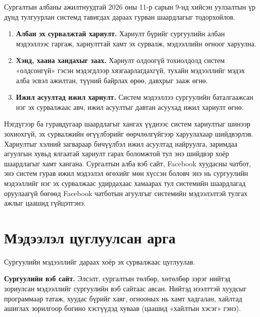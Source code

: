 Сургалтын албаны ажилтнуудтай 2026 оны 11-р сарын 9-нд хийсэн уулзалтын үр дүнд тулгуурлан системд тавигдах дараах гурван шаардлагыг тодорхойлов.
\begin{enumerate}
    \item \textbf{Албан эх сурвалжтай хариулт.} Хариулт бүрийг сургуулийн албан мэдээллээс гаргаж, хариулттай хамт эх сурвалж, мэдээллийн огноог харуулна.
    \item \textbf{Хэнд, хаана хандахыг заах.} Хариулт олдоогүй тохиолдолд систем «олдсонгүй» гэсэн мэдэгдлээр хязгаарлагдахгүй, тухайн мэдээллийг мэдэх алба эсвэл ажилтан, түүний байрлах өрөө, давхрыг зааж өгнө.
    \item \textbf{Ижил асуултад ижил хариулт.} Систем мэдээллээ сургуулийн баталгаажсан нэг эх сурвалжаас авч, ижил асуултыг давтан асуухад ижил хариулт өгнө.
\end{enumerate}

Нэгдүгээр ба гуравдугаар шаардлагыг хангах үүднээс систем хариултыг шинээр зохиохгүй, эх сурвалжийн өгүүлбэрийг өөрчлөлгүйгээр харуулахаар шийдвэрлэв. Хариултыг хэлний загвараар бичүүлбэл ижил асуултад найруулга, заримдаа агуулгын хувьд ялгаатай хариулт гарах боломжтой тул энэ шийдвэр хоёр шаардлагыг хамт хангана. Сургалтын алба вэб сайт, Facebook хуудасны чатбот, энэ систем гурав ижил мэдээлэл өгөхийг мөн хүссэн боловч энэ нь сургуулийн мэдээллийг нэг эх сурвалжаас удирдахаас хамаарах тул системийн шаардлагад оруулаагүй бөгөөд Facebook чатботын агуулгыг системийн мэдээлэлтэй тулгах ажлыг цаашид гүйцэтгэнэ.

\section{Мэдээлэл цуглуулсан арга}
\label{sec:data-sources}

Сургуулийн мэдээллийг дараах хоёр эх сурвалжаас цуглуулав.

\textbf{Сургуулийн вэб сайт.} Элсэлт, сургалтын төлбөр, хөтөлбөр зэрэг нийтэд зориулсан мэдээллийг сургуулийн вэб сайтаас авсан. Нийтэд нээлттэй хуудсыг программаар татаж, хуудас бүрийг хаяг, огнооных нь хамт хадгалан, хайлтад ашиглах зорилгоор богино хэсгүүдэд хуваав (цаашид «хайлтын хэсэг» гэнэ).

